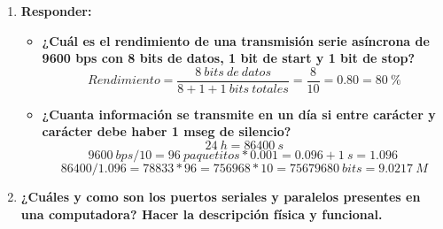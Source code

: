 \documentclass[a4paper,12pt]{article}
\begin{document}
\begin{enumerate}
  \item \textbf{Responder:}
  \begin{itemize}
   \item \textbf{¿Cuál es el rendimiento de una transmisión serie asíncrona de 9600 bps con 8 bits de datos, 1 bit de
start y 1 bit de stop?}
  $$Rendimiento=\frac{8\:bits\:de\:datos}{8 + 1 + 1\:bits\:totales} = \frac{8}{10} = 0.80 = 80\:\%$$

   \item \textbf{¿Cuanta información se transmite en un día si entre carácter y carácter debe haber
1 mseg de silencio?}
  $$24\:h = 86400\:s$$
  $$9600\:bps / 10 = 96\:paquetitos * 0.001 = 0.096 + 1\:s = 1.096\:$$
  $$86400 / 1.096 = 78833 * 96 = 756968 * 10 = 75679680\:bits = 9.0217\:M$$
  \end{itemize}
  
  \item \textbf{¿Cuáles y como son los puertos seriales y paralelos presentes en una computadora? Hacer la
descripción física y funcional.}


\end{enumerate}
\end{document}

